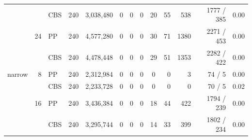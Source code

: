 \begin{table}[t]
\begin{tabular}{lrlrrccccrrrc}
 &  & CBS & 240 & 3{,}038{,}480 & 0 & 0 & 0 & 20 & 55 & 538 & 1777 / 385 & 0.00\\
 & 24 & PP & 240 & 4{,}577{,}280 & 0 & 0 & 0 & 30 & 71 & 1380 & 2271 / 453 & 0.00\\
 &  & CBS & 240 & 4{,}478{,}448 & 0 & 0 & 0 & 29 & 51 & 1353 & 2282 / 422 & 0.00\\
\midrule
narrow & 8 & PP & 240 & 2{,}312{,}984 & 0 & 0 & 0 & 0 & 0 & 3 & 74 / 5 & 0.00\\
 &  & CBS & 240 & 2{,}233{,}728 & 0 & 0 & 0 & 0 & 0 & 0 & 70 / 5 & 0.02\\
 & 16 & PP & 240 & 3{,}436{,}384 & 0 & 0 & 0 & 18 & 44 & 422 & 1794 / 239 & 0.00\\
 &  & CBS & 240 & 3{,}295{,}744 & 0 & 0 & 0 & 14 & 33 & 399 & 1802 / 234 & 0.00\\
\bottomrule
\end{tabular}
\end{table}
